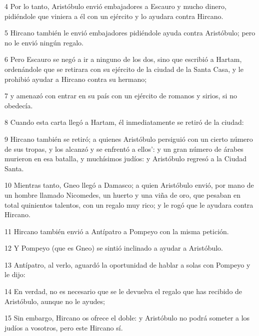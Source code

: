 \par 4 Por lo tanto, Aristóbulo envió embajadores a Escauro y mucho dinero, pidiéndole que viniera a él con un ejército y lo ayudara contra Hircano.

\par 5 Hircano también le envió embajadores pidiéndole ayuda contra Aristóbulo; pero no le envió ningún regalo.

\par 6 Pero Escauro se negó a ir a ninguno de los dos, sino que escribió a Hartam, ordenándole que se retirara con su ejército de la ciudad de la Santa Casa, y le prohibió ayudar a Hircano contra su hermano;

\par 7 y amenazó con entrar en su país con un ejército de romanos y sirios, si no obedecía.

\par 8 Cuando esta carta llegó a Hartam, él inmediatamente se retiró de la ciudad:

\par 9 Hircano también se retiró; a quienes Aristóbulo persiguió con un cierto número de sus tropas, y los alcanzó y se enfrentó a ellos': y un gran número de árabes murieron en esa batalla, y muchísimos judíos: y Aristóbulo regresó a la Ciudad Santa.

\par 10 Mientras tanto, Gneo llegó a Damasco; a quien Aristóbulo envió, por mano de un hombre llamado Nicomedes, un huerto y una viña de oro, que pesaban en total quinientos talentos, con un regalo muy rico; y le rogó que le ayudara contra Hircano.

\par 11 Hircano también envió a Antípatro a Pompeyo con la misma petición.

\par 12 Y Pompeyo (que es Gneo) se sintió inclinado a ayudar a Aristóbulo.

\par 13 Antípatro, al verlo, aguardó la oportunidad de hablar a solas con Pompeyo y le dijo:

\par 14 En verdad, no es necesario que se le devuelva el regalo que has recibido de Aristóbulo, aunque no le ayudes;

\par 15 Sin embargo, Hircano os ofrece el doble: y Aristóbulo no podrá someter a los judíos a vosotros, pero este Hircano sí.

